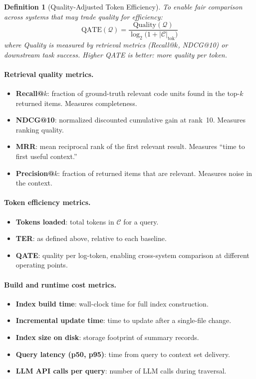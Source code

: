 \documentclass[11pt,a4paper]{article}
\newtheorem{definition}{Definition}
\newcommand{\query}{\mathcal{Q}}
\newcommand{\context}{\mathcal{C}}
\begin{document}
\begin{definition}[Quality-Adjusted Token Efficiency]\label{def:qate}
To enable fair comparison across systems that may trade quality for efficiency:
\begin{equation}\label{eq:qate}
    \text{QATE}(\query) = \frac{\text{Quality}(\query)}{\log_2\!\bigl(1 + |\context|_{\text{tok}}\bigr)}
\end{equation}
where Quality is measured by retrieval metrics (Recall@$k$, NDCG@10) or downstream task success.
Higher QATE is better: more quality per token.
\end{definition}

\paragraph{Retrieval quality metrics.}
\begin{itemize}[nosep]
    \item \textbf{Recall@$k$}: fraction of ground-truth relevant code units found in the top-$k$ returned items. Measures completeness.
    \item \textbf{NDCG@10}: normalized discounted cumulative gain at rank~10. Measures ranking quality.
    \item \textbf{MRR}: mean reciprocal rank of the first relevant result. Measures ``time to first useful context.''
    \item \textbf{Precision@$k$}: fraction of returned items that are relevant. Measures noise in the context.
\end{itemize}

\paragraph{Token efficiency metrics.}
\begin{itemize}[nosep]
    \item \textbf{Tokens loaded}: total tokens in $\context$ for a query.
    \item \textbf{TER}: as defined above, relative to each baseline.
    \item \textbf{QATE}: quality per log-token, enabling cross-system comparison at different operating points.
\end{itemize}

\paragraph{Build and runtime cost metrics.}
\begin{itemize}[nosep]
    \item \textbf{Index build time}: wall-clock time for full index construction.
    \item \textbf{Incremental update time}: time to update after a single-file change.
    \item \textbf{Index size on disk}: storage footprint of summary records.
    \item \textbf{Query latency (p50, p95)}: time from query to context set delivery.
    \item \textbf{LLM API calls per query}: number of LLM calls during traversal.
\end{itemize}
\end{document}
